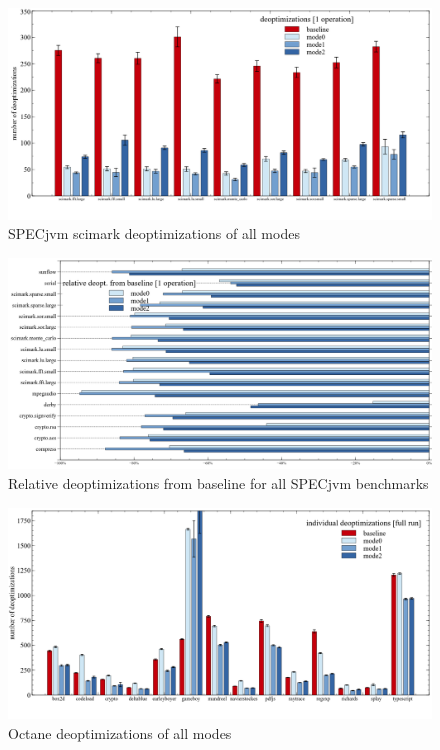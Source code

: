 \begin{figure}[ht]
  \begin{center}
    \centering
    \includegraphics[width=1.0\textwidth]{figures/scimark_warmup_deopt.png}
    \caption{SPECjvm scimark deoptimizations of all modes}
    \label{f:scimark_warmup_deopt}
  \end{center}
\end{figure}

\begin{figure}[ht]
  \begin{center}
    \centering
    \includegraphics[width=1.0\textwidth]{figures/all_warmup_variation_deopt.png}
    \caption{Relative deoptimizations from baseline for all SPECjvm benchmarks}
    \label{f:all_warmup_variation_deopt}
  \end{center}
\end{figure}

\begin{figure}[ht]
  \begin{center}
    \centering
    \includegraphics[width=1.0\textwidth]{figures/octane_deopt.png}
    \caption{Octane deoptimizations of all modes} 
    \label{f:octane_deopt}
  \end{center}
\end{figure}



